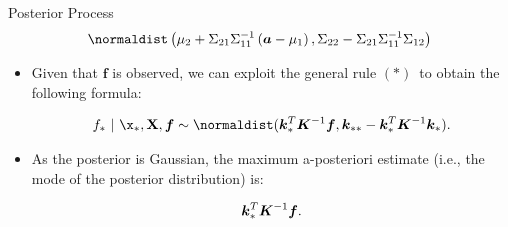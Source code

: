 \begin{frame}[c,allowframebreaks]{Posterior Process}
$$
\normaldist\left(\mu_2 + \Sigma_{21} \Sigma_{11}^{-1}\left(\bm{a} - \mu_1\right), \Sigma_{22} - \Sigma_{21}\Sigma_{11}^{-1}\Sigma_{12} \right)
$$


\framebreak


\begin{itemize}

\item Given that $\bm{f}$ is observed, we can exploit the general rule ${(*)}\,$ to obtain the following formula: 

\begin{eqnarray*}
f_* ~|~ \x_*, \Xmat, \bm{f} \sim \normaldist(\bm{k}_{*}^{T}\Kmat^{-1}\bm{f}, \bm{k}_{**} - \bm{k}_*^T \Kmat ^{-1}\bm{k}_*).
\end{eqnarray*}

\lz
\lz

\item As the posterior is Gaussian, the maximum a-posteriori estimate (i.e., the mode of the posterior distribution) is:

\large $$\bm{k}_{*}^{T}\bm{K}^{-1}\bm{f}.$$

\end{itemize}
\end{frame}
